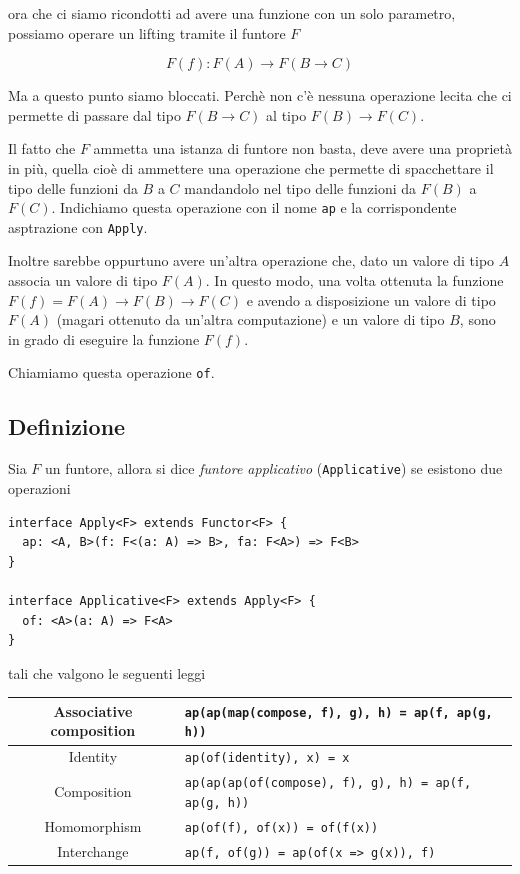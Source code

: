 \documentclass[12pt]{article}
\begin{document}
ora che ci siamo ricondotti ad avere una funzione con un solo parametro, possiamo operare un lifting tramite il funtore $F$

$$
F(f): F(A) \rightarrow F(B \rightarrow C)
$$

Ma a questo punto siamo bloccati.
Perchè non c'è nessuna operazione lecita che ci permette di passare dal tipo $F(B \rightarrow C)$ al tipo $F(B) \rightarrow F(C)$.

Il fatto che $F$ ammetta una istanza di funtore non basta, deve avere una proprietà in più, quella cioè di ammettere una operazione che permette di
spacchettare il tipo delle funzioni da $B$ a $C$ mandandolo nel tipo delle funzioni da $F(B)$ a $F(C)$.
Indichiamo questa operazione con il nome \texttt{ap} e la corrispondente asptrazione con \texttt{Apply}.

Inoltre sarebbe oppurtuno avere un'altra operazione che, dato un valore di tipo $A$ associa un valore di tipo $F(A)$.
In questo modo, una volta ottenuta la funzione $F(f) = F(A) \rightarrow F(B) \rightarrow F(C)$ e avendo a disposizione un valore di tipo $F(A)$
(magari ottenuto da un'altra computazione) e un valore di tipo $B$, sono in grado di eseguire la funzione $F(f)$.

Chiamiamo questa operazione \texttt{of}.

\subsection{Definizione}

Sia $F$ un funtore, allora si dice \emph{funtore applicativo} (\texttt{Applicative}) se esistono due operazioni

\begin{verbatim}
interface Apply<F> extends Functor<F> {
  ap: <A, B>(f: F<(a: A) => B>, fa: F<A>) => F<B>
}

interface Applicative<F> extends Apply<F> {
  of: <A>(a: A) => F<A>
}
\end{verbatim}

tali che valgono le seguenti leggi

\begin{center}
\bgroup
\def\arraystretch{1.5}
\begin{tabular}{ |c|p{10cm}| }
\hline
Associative composition & \texttt{ap(ap(map(compose, f), g), h) = ap(f, ap(g, h))} \\
\hline
Identity & \texttt{ap(of(identity), x) = x} \\
\hline
Composition & \texttt{ap(ap(ap(of(compose), f), g), h) = ap(f, ap(g, h))} \\
\hline
Homomorphism & \texttt{ap(of(f), of(x)) = of(f(x))} \\
\hline
Interchange & \texttt{ap(f, of(g)) = ap(of(x => g(x)), f)} \\
\hline
\end{tabular}
\egroup
\end{center}
\end{document}
